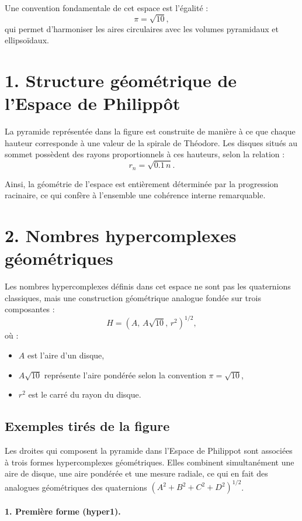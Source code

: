 \documentclass[12pt]{article}
\begin{document}
Une convention fondamentale de cet espace est l’égalité :
\[
\pi = \sqrt{10},
\]
qui permet d’harmoniser les aires circulaires avec les volumes pyramidaux et ellipsoïdaux.

\section*{1. Structure géométrique de l’Espace de Philippôt}

La pyramide représentée dans la figure est construite de manière à ce que chaque hauteur corresponde à une valeur de la spirale de Théodore. Les disques situés au sommet possèdent des rayons proportionnels à ces hauteurs, selon la relation :
\[
r_n = \sqrt{0.1\,n}.
\]

Ainsi, la géométrie de l’espace est entièrement déterminée par la progression racinaire, ce qui confère à l’ensemble une cohérence interne remarquable.

\section*{2. Nombres hypercomplexes géométriques}

Les nombres hypercomplexes définis dans cet espace ne sont pas les quaternions classiques, mais une construction géométrique analogue fondée sur trois composantes :
\[
H = \left( A,\, A\sqrt{10},\, r^2 \right)^{1/2},
\]
où :
\begin{itemize}
    \item $A$ est l’aire d’un disque,
    \item $A\sqrt{10}$ représente l’aire pondérée selon la convention $\pi=\sqrt{10}$,
    \item $r^2$ est le carré du rayon du disque.
\end{itemize}

\subsection*{Exemples tirés de la figure}

Les droites qui composent la pyramide dans l’Espace de Philippot sont
associées à trois formes hypercomplexes géométriques. Elles combinent
simultanément une aire de disque, une aire pondérée et une mesure
radiale, ce qui en fait des analogues géométriques des quaternions
$(A^2 + B^2 + C^2 + D^2)^{1/2}$.

\paragraph{1. Première forme (hyper1).}
\end{document}
